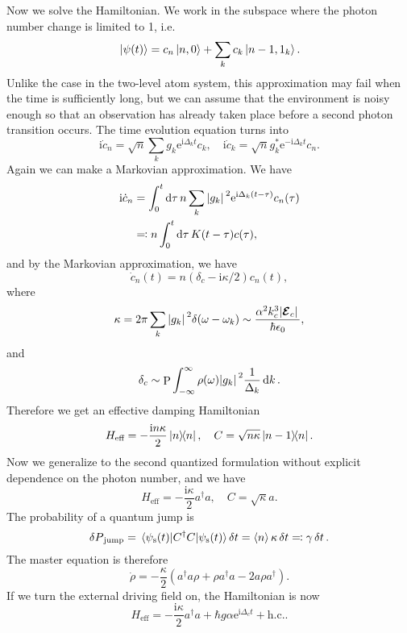 \documentclass[hyperref, a4paper]{article}
\DeclareMathOperator{\primevalue}{P}
\newcommand*{\ii}{\mathrm{i}}
\newcommand*{\ee}{\mathrm{e}}
\begin{document}
Now we solve the Hamiltonian. We work in the subspace where the photon number change is limited to 1, i.e.
\begin{equation}
    \ket*{\psi(t)} = c_n \ket*{n, 0} + \sum_k c_k \ket*{n-1, 1_k}.
\end{equation}
Unlike the case in the two-level atom system, this approximation may fail when the time is sufficiently long,
but we can assume that the environment is noisy enough so that an observation has already taken place before 
a second photon transition occurs. The time evolution equation turns into
\begin{equation}
    \ii \dot{c}_n = \sqrt{n} \sum_k g_k \ee^{\ii \Delta_k t} c_k, \quad 
    \ii \dot{c}_k = \sqrt{n} g_k^* \ee^{- \ii \Delta_k t} c_n. 
\end{equation} 
Again we can make a Markovian approximation. We have 
\[
    \begin{aligned}
        \ii \dot{c}_n &= \int_0^t \dd{\tau} n \sum_k \abs*{g_k}^2 \ee^{\ii \Delta_k (t - \tau)} c_n(\tau) \\
        &\eqqcolon n \int_0^t \dd{\tau } K(t - \tau) c(\tau),
    \end{aligned}
\]
and by the Markovian approximation, we have 
\begin{equation}
    \dot{c}_n(t) = n (\delta_c - \ii \kappa / 2) c_n(t),
\end{equation}
where 
\begin{equation}
    \kappa = 2 \pi \sum_k \abs*{g_k}^2 \delta(\omega - \omega_k) \sim \frac{\alpha^2 k_c^3 \abs*{\vb*{\mathcal{E}}_c}}{\hbar \epsilon_0},
\end{equation}
and 
\begin{equation}
    \delta_c \sim \primevalue \int_{-\infty}^\infty \rho(\omega) \abs*{g_k}^2 \frac{1}{\Delta_k} \dd{k}.
\end{equation}
Therefore we get an effective damping Hamiltonian 
\begin{equation}
    H_\text{eff} = - \frac{\ii n \kappa}{2} \dyad{n}, \quad C = \sqrt{n \kappa} \dyad*{n-1}{n}.
\end{equation}
Now we generalize to the second quantized formulation without explicit dependence on the photon number, and we have 
\begin{equation}
    H_\text{eff} = - \frac{\ii \kappa}{2} a^\dagger a, \quad C = \sqrt{\kappa} a.
\end{equation}
The probability of a quantum jump is 
\begin{equation}
    \var{P}_\text{jump} = \mel{\psi_\text{s}(t)}{C^\dagger C}{\psi_\text{s}(t)} \var{t} = \expval{n} \kappa \var{t} \eqqcolon \gamma \var{t}.
\end{equation}
The master equation is therefore 
\begin{equation}
    \dot{\rho} = - \frac{\kappa}{2} \left( a^\dagger a \rho + \rho a^\dagger a - 2 a \rho a^\dagger \right).
\end{equation}
If we turn the external driving field on, the Hamiltonian is now 
\begin{equation}
    H_\text{eff} = - \frac{\ii \kappa}{2} a^\dagger a + \hbar g \alpha \ee^{\ii \Delta_c t} + \text{h.c.}.
    \label{eq:damping-and-driving}
\end{equation}
\end{document}
